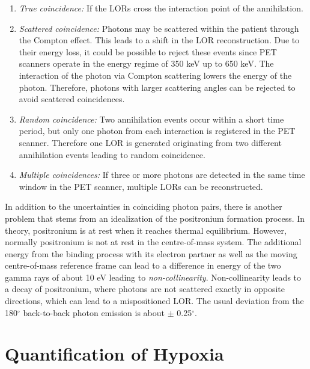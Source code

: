 \begin{enumerate}
\item \textit{True coincidence: }If the LORs cross the interaction point of the annihilation.
\item \textit{Scattered coincidence: }Photons may be scattered within the patient through the Compton effect. This leads to a shift in the LOR reconstruction. Due to their energy loss, it could be possible to reject these events since PET scanners operate in the energy regime of 350 keV up to 650 keV. The interaction of the photon via Compton scattering lowers the energy of the photon. Therefore, photons with larger scattering angles can be rejected to avoid scattered coincidences.\
\item \textit{Random coincidence: }Two annihilation events occur within a short time period, but only one photon from each interaction is registered in the PET scanner. Therefore one LOR is generated originating from two different annihilation events leading to random coincidence. 
\item \textit{Multiple coincidences: }If three or more photons are detected in the same time window in the PET scanner, multiple LORs can be reconstructed.
\end{enumerate}
In addition to the uncertainties in coinciding photon pairs, there is another problem that stems from an idealization of the positronium formation process. In theory, positronium is at rest when it reaches thermal equilibrium. However, normally positronium is not at rest in the centre-of-mass system. The additional energy from the binding process with its electron partner as well as the moving centre-of-mass reference frame can lead to a difference in energy of the two gamma rays of about 10 eV leading to \textit{non-collinearity}. Non-collinearity leads to a decay of positronium, where photons are not scattered exactly in opposite directions, which can lead to a mispositioned LOR. The usual deviation from the 180$^\circ$ back-to-back photon emission is about $\pm$ 0.25$^\circ$\cite{Cherry}.

\section{Quantification of Hypoxia}
